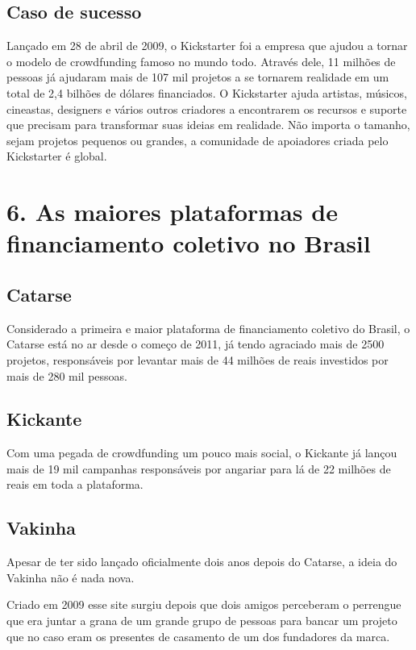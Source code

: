 \documentclass{classe_cn}                 %
\begin{document}
\subsection{Caso de sucesso}

Lançado em 28 de abril de 2009, o Kickstarter foi a empresa que ajudou a tornar o modelo de crowdfunding famoso no mundo todo. Através dele, 11 milhões de pessoas já ajudaram mais de 107 mil projetos a se tornarem realidade em um total de 2,4 bilhões de dólares financiados. O Kickstarter ajuda artistas, músicos, cineastas, designers e vários outros criadores a encontrarem os recursos e suporte que precisam para transformar suas ideias em realidade. Não importa o tamanho, sejam projetos pequenos ou grandes, a comunidade de apoiadores criada pelo Kickstarter é global.

\section{6. As maiores plataformas de financiamento coletivo no Brasil}

\subsection{Catarse}

Considerado a primeira e maior plataforma de financiamento coletivo do Brasil, o Catarse está no ar desde o começo de 2011, já tendo agraciado mais de 2500 projetos, responsáveis por levantar mais de 44 milhões de reais investidos por mais de 280 mil pessoas.

\subsection{Kickante}

Com uma pegada de crowdfunding um pouco mais social, o Kickante já lançou mais de 19 mil campanhas responsáveis por angariar para lá de 22 milhões de reais em toda a plataforma.

\subsection{Vakinha}

Apesar de ter sido lançado oficialmente dois anos depois do Catarse, a ideia do Vakinha não é nada nova.

Criado em 2009 esse site surgiu depois que dois amigos perceberam o perrengue que era juntar a grana de um grande grupo de pessoas para bancar um projeto que no caso eram os presentes de casamento de um dos fundadores da marca.
\end{document}
